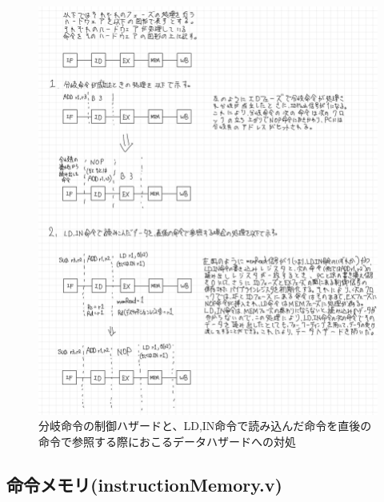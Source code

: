 \documentclass[a4j,titlepage]{jarticle}
\begin{document}
\begin{figure}[H]
    \begin{center}
    \includegraphics[scale = 0.22]{bunkidata.jpg}
    \end{center}
    \caption{分岐命令の制御ハザードと、LD,IN命令で読み込んだ命令を直後の命令で参照する際におこるデータハザードへの対処}
    \label{bunkide-ta}
\end{figure}


\newpage
\subsection{命令メモリ(instructionMemory.v)}
\end{document}
